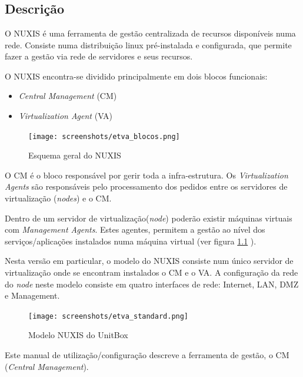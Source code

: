 \chapter{\textsf{\acronym}}
\section*{Descrição}
O NUXIS é uma ferramenta de gestão centralizada de recursos disponíveis numa rede. Consiste numa distribuição linux pré-instalada e configurada, que permite fazer a gestão via rede de servidores e seus recursos.

O NUXIS encontra-se dividido principalmente em dois blocos funcionais:

\begin{itemize}
	\item \emph{Central Management} (CM)
        \item \emph{Virtualization Agent} (VA)
\end{itemize}

\begin{figure}[H]
	\begin{center}
	\texttt{[image: screenshots/etva\_blocos.png]}
	\caption{Esquema geral do NUXIS}
	\label{fig:etva_blocos}
	\end{center}
\end{figure}

O CM é o bloco responsável por gerir toda a infra-estrutura.
Os \emph{Virtualization Agents} são responsáveis pelo processamento dos pedidos entre os servidores de virtualização (\emph{nodes}) e o CM.

Dentro de um servidor de virtualização(\emph{node}) poderão existir máquinas virtuais com \emph{Management Agents}. Estes agentes, permitem a gestão ao nível dos serviços/aplicações instalados numa máquina virtual (ver figura \ref{fig:etva_blocos} ).

Nesta versão em particular, o modelo do NUXIS consiste num único servidor de virtualização onde se encontram instalados o CM e o VA. A configuração da rede do \emph{node} neste modelo consiste em quatro interfaces de rede: Internet, LAN, DMZ e Management.
\begin{figure}[H]
    \begin{center}
	\texttt{[image: screenshots/etva\_standard.png]}
	\caption{Modelo NUXIS do UnitBox}
	\label{fig:etva_standard}
	\end{center}
\end{figure}
 
Este manual de utilização/configuração descreve a ferramenta de gestão, o CM (\emph{Central Management}).

